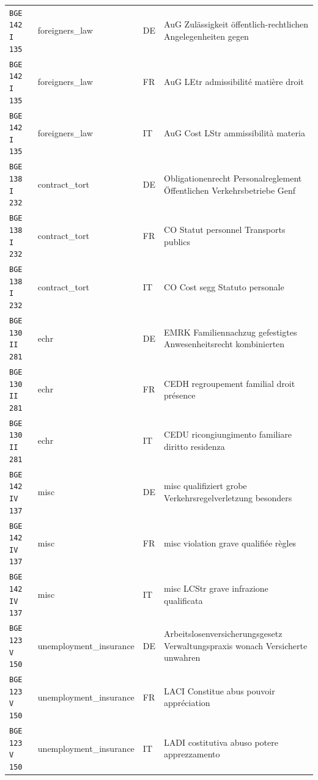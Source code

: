 \begin{table}[h]
\begin{tabular}{>{\raggedright\arraybackslash}p{2.2cm} >{\raggedright\arraybackslash}p{3.55cm} >{\raggedright\arraybackslash}p{0.8cm} >{\raggedright\arraybackslash}p{8.05cm}}
\texttt{BGE 142 I 135} & foreigners\_law & DE & AuG Zulässigkeit öffentlich-rechtlichen Angelegenheiten gegen \\
\texttt{BGE 142 I 135} & foreigners\_law & FR & AuG LEtr admissibilité matière droit \\
\texttt{BGE 142 I 135} & foreigners\_law & IT & AuG Cost LStr ammissibilità materia \\
\texttt{BGE 138 I 232} & contract\_tort & DE & Obligationenrecht Personalreglement Öffentlichen Verkehrsbetriebe Genf \\
\texttt{BGE 138 I 232} & contract\_tort & FR & CO Statut personnel Transports publics \\
\texttt{BGE 138 I 232} & contract\_tort & IT & CO Cost segg Statuto personale \\
\texttt{BGE 130 II 281} & echr & DE & EMRK Familiennachzug gefestigtes Anwesenheitsrecht kombinierten \\
\texttt{BGE 130 II 281} & echr & FR & CEDH regroupement familial droit présence \\
\texttt{BGE 130 II 281} & echr & IT & CEDU ricongiungimento familiare diritto residenza \\
\texttt{BGE 142 IV 137} & misc & DE & misc qualifiziert grobe Verkehrsregelverletzung besonders \\
\texttt{BGE 142 IV 137} & misc & FR & misc violation grave qualifiée règles \\
\texttt{BGE 142 IV 137} & misc & IT & misc LCStr grave infrazione qualificata \\
\texttt{BGE 123 V 150} & unemployment\_insurance & DE & Arbeitslosenversicherungsgesetz Verwaltungspraxis wonach Versicherte unwahren \\
\texttt{BGE 123 V 150} & unemployment\_insurance & FR & LACI Constitue abus pouvoir appréciation \\
\texttt{BGE 123 V 150} & unemployment\_insurance & IT & LADI costitutiva abuso potere apprezzamento \\
\bottomrule
\end{tabular}
\end{table}
\clearpage
